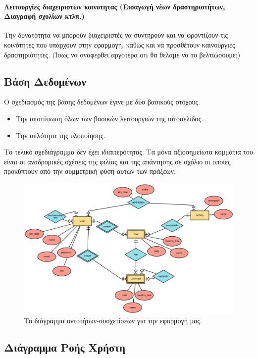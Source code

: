 \documentclass[nonacm, language=english, language=greek]{acmart}
\begin{document}
\paragraph{Λειτουργίες διαχειριστων κοινοτητας (Εισαγωγή νέων δραστηριοτήτων, Διαγραφή σχολίων κτλπ.)}
Την δυνατότητα να μπορούν διαχειριστές να συντηρούν και να φροντίζουν τις
κοινότητες που υπάρχουν στην εφαρμογή, καθώς και να προσθέτουν καινούργιες
δραστηριότητες. (Ίσως να αναφερθει αργοτερα οτι θα θελαμε να το βελτιώσουμε;)

\subsection{Βάση Δεδομένων}

Ο σχεδιασμός της βάσης δεδομένων έγινε με δύο βασικούς στόχους. 

\begin{itemize}
    \item Την αποτύπωση όλων των βασικών λειτουργιών της ιστοσελίδας.
    \item Την απλότητα της υλοποίησης.
\end{itemize}

Το τελικό σχεδιάγραμμα δεν έχει ιδιαιτερότητας. Τα μόνα 
αξιοσημείωτα κομμάτια του είναι οι αναδρομικές σχέσεις 
της φιλίας και της απάντησης σε σχόλιο οι οποίες προκύπτουν 
από την συμμετρική φύση αυτών των πράξεων.

\begin{figure}[htpb]
    \centering
    \includegraphics[width=\textwidth]{./assets/erd.png}
    \caption{Το διάγραμμα οντοτήτων-συσχετίσεων για την εφαρμογή μας.}
    \label{fig:}
\end{figure}

\subsection{Διάγραμμα Ροής Χρήστη}
\end{document}
